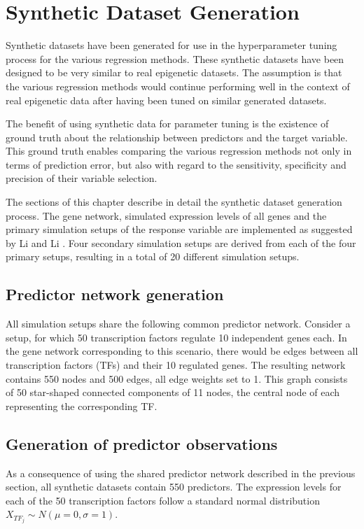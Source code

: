 \chapter{Synthetic Dataset Generation}
Synthetic datasets have been generated for use in the hyperparameter tuning process for the various regression methods. These synthetic datasets have been designed to be very similar to real epigenetic datasets. The assumption is that the various regression methods would continue performing well in the context of real epigenetic data after having been tuned on similar generated datasets.

The benefit of using synthetic data for parameter tuning is the existence of ground truth about the relationship between predictors and the target variable. This ground truth enables comparing the various regression methods not only in terms of prediction error, but also with regard to the sensitivity, specificity and precision of their variable selection.

The sections of this chapter describe in detail the synthetic dataset generation process. The gene network, simulated expression levels of all genes and the primary simulation setups of the response variable are implemented as suggested by Li and Li \cite{li2008network}. Four secondary simulation setups are derived from each of the four primary setups, resulting in a total of 20 different simulation setups.


\section{Predictor network generation} \label{sec:pred_net}
All simulation setups share the following common predictor network. Consider a setup, for which 50 transcription factors regulate 10 independent genes each. In the gene network corresponding to this scenario, there would be edges between all transcription factors (TFs) and their 10 regulated genes. The resulting network contains 550 nodes and 500 edges, all edge weights set to 1. This graph consists of 50 star-shaped connected components of 11 nodes, the central node of each representing the corresponding TF. 


\section{Generation of predictor observations} \label{sec:obs_gen}
As a consequence of using the shared predictor network described in the previous section, all synthetic datasets contain 550 predictors. The expression levels for each of the 50 transcription factors follow a standard normal distribution $X_{TF_j} \sim N(\mu = 0, \sigma = 1)$. 

